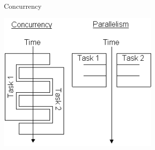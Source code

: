 \begin{frame}[fragile]{Concurrency}
  \begin{center}
    \includegraphics[height=7cm,keepaspectratio]{sources/images/concurrency-100158287-orig.png}
  \end{center}
\end{frame}
